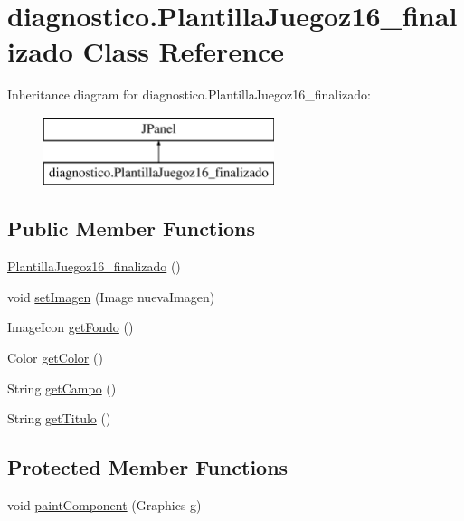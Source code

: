 \hypertarget{classdiagnostico_1_1_plantilla_juegoz16__finalizado}{}\section{diagnostico.\+Plantilla\+Juegoz16\+\_\+finalizado Class Reference}
\label{classdiagnostico_1_1_plantilla_juegoz16__finalizado}
Inheritance diagram for diagnostico.\+Plantilla\+Juegoz16\+\_\+finalizado\+:\begin{figure}[H]
\begin{center}
\leavevmode
\includegraphics[height=2.000000cm]{classdiagnostico_1_1_plantilla_juegoz16__finalizado}
\end{center}
\end{figure}
\subsection*{Public Member Functions}
\begin{DoxyCompactItemize}
\item 
\mbox{\hyperlink{classdiagnostico_1_1_plantilla_juegoz16__finalizado_a5e0c034992a2ba658d790629b57212f5}{Plantilla\+Juegoz16\+\_\+finalizado}} ()
\item 
void \mbox{\hyperlink{classdiagnostico_1_1_plantilla_juegoz16__finalizado_a3901c5e6e60b75ee7a56c5f7253795f6}{set\+Imagen}} (Image nueva\+Imagen)
\item 
Image\+Icon \mbox{\hyperlink{classdiagnostico_1_1_plantilla_juegoz16__finalizado_a4a3641cff3d2613c9e2e2bac06f6ecfe}{get\+Fondo}} ()
\item 
Color \mbox{\hyperlink{classdiagnostico_1_1_plantilla_juegoz16__finalizado_a7a5199bcbf98ff43d73e7a1779f95c96}{get\+Color}} ()
\item 
String \mbox{\hyperlink{classdiagnostico_1_1_plantilla_juegoz16__finalizado_a6a3727a2253308207bde233c87135f14}{get\+Campo}} ()
\item 
String \mbox{\hyperlink{classdiagnostico_1_1_plantilla_juegoz16__finalizado_a9558d7a87a608ed2da35949ef32dc102}{get\+Titulo}} ()
\end{DoxyCompactItemize}
\subsection*{Protected Member Functions}
\begin{DoxyCompactItemize}
\item 
void \mbox{\hyperlink{classdiagnostico_1_1_plantilla_juegoz16__finalizado_a1611fd1bc952e3d478c1c8606d2375be}{paint\+Component}} (Graphics g)
\end{DoxyCompactItemize}


